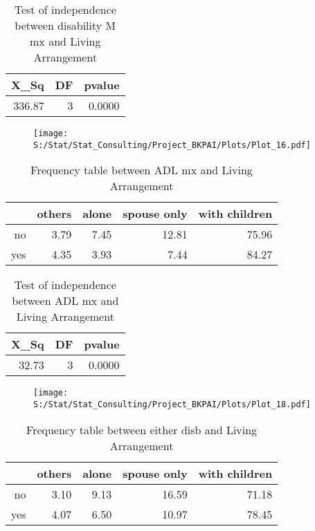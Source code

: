 \documentclass[11pt]{article}
\begin{document}
\begin{table}[H]
\centering
\begin{tabular}{rrr}
  \hline
X\_Sq & DF & pvalue \\ 
  \hline
336.87 & 3 & 0.0000 \\ 
   \hline
\end{tabular}
\caption{Test of independence between disability M mx and Living Arrangement} 
\end{table}
\begin{center}
\begin{figure}[H]
\texttt{[image: S:/Stat/Stat\_Consulting/Project\_BKPAI/Plots/Plot\_16.pdf]}

\end{figure}
\end{center}
\begin{table}[H]
\centering
\begin{tabular}{rrrrr}
  \hline
 & others & alone & spouse only & with children \\ 
  \hline
no & 3.79 & 7.45 & 12.81 & 75.96 \\ 
  yes & 4.35 & 3.93 & 7.44 & 84.27 \\ 
   \hline
\end{tabular}
\caption{Frequency table between ADL mx and Living Arrangement} 
\end{table}
\begin{table}[H]
\centering
\begin{tabular}{rrr}
  \hline
X\_Sq & DF & pvalue \\ 
  \hline
32.73 & 3 & 0.0000 \\ 
   \hline
\end{tabular}
\caption{Test of independence between ADL mx and Living Arrangement} 
\end{table}
\begin{center}
\begin{figure}[H]
\texttt{[image: S:/Stat/Stat\_Consulting/Project\_BKPAI/Plots/Plot\_18.pdf]}

\end{figure}
\end{center}
\begin{table}[H]
\centering
\begin{tabular}{rrrrr}
  \hline
 & others & alone & spouse only & with children \\ 
  \hline
no & 3.10 & 9.13 & 16.59 & 71.18 \\ 
  yes & 4.07 & 6.50 & 10.97 & 78.45 \\ 
   \hline
\end{tabular}
\caption{Frequency table between either disb and Living Arrangement} 
\end{table}
\end{document}
